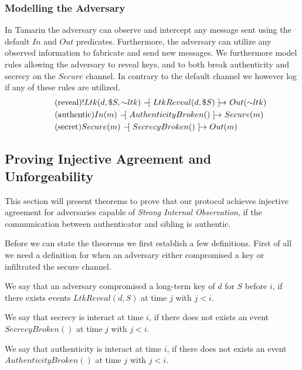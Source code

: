 \subsubsection{Modelling the Adversary}
In Tamarin the adversary can observe and intercept any message sent using the default $In$ and $Out$ predicates. Furthermore, the adversary can utilize any observed information to fabricate and send new messages. We furthermore model rules allowing the adversary to reveal keys, and to both break authenticity and secrecy on the $Secure$ channel. In contrary to the default channel we however log if any of these rules are utilized.
\begin{align} 
& \tag{reveal} !Ltk(d, \$S, {\sim}ltk) \ifarrow[ LtkReveal(d, \$S) ] Out({\sim}ltk) \\
& \tag{authentic} In(m) \ifarrow[ AuthenticityBroken() ] Secure(m) \\
& \tag{secret} Secure(m) \ifarrow[ SecrecyBroken() ] Out(m)
\end{align}

\subsection{Proving Injective Agreement and Unforgeability}

This section will present theorems to prove that our protocol achieves injective agreement for adversaries capable of \textit{Strong \textit{Internal Observation}}, if the communication between \gls{authenticator} and \gls{sibling} is authentic.

Before we can state the theorems we first establish a few definitions. First of all we need a definition for when an adversary either compromised a key or infiltrated the secure channel. 

\begin{definition}
We say that an adversary compromised a long-term key of $d$ for $S$ before $i$, if there exists events $LtkReveal(d,S)$ at time $j$ with $j < i$.
\end{definition}

\begin{definition}
We say that secrecy is interact at time $i$, if there does not exists an event $SecrecyBroken()$ at time $j$ with $j < i$.
\end{definition}

\begin{definition}
We say that authenticity is interact at time $i$, if there does not exists an event $AuthenticityBroken()$ at time $j$ with $j < i$.
\end{definition}

